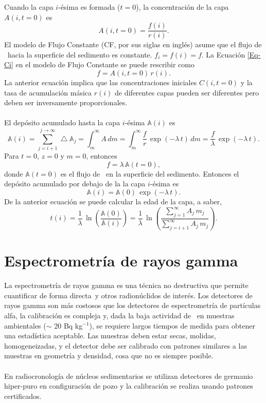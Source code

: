 Cuando la capa $i$-ésima es formada ($t=0$), la concentración de la capa $A(i, t=0)$ es
\begin{equation}\label{Eq-Ci}
A(i, t=0) = \dfrac{f(i)}{r(i)}.
\end{equation}
El modelo de Flujo Constante (CF, por sus siglas en inglés) asume que el flujo de \PbCeroEx\, hacia la superficie del sedimento es constante. $f_i = f(i) = f$. La Ecuación \ref{Eq-Ci} en el modelo de Flujo Constante se puede rescribir como 
\begin{equation}\label{Eq-FC}
f = A(i,t=0)\, r(i).
\end{equation}
La anterior ecuación implica que las concentraciones iniciales $C(i, t=0)$ y la tasa de acumulación másica $r(i)$ de diferentes capas pueden ser diferentes pero deben ser inversamente proporcionales. 
\\ \\ 
El depósito acumulado hasta la capa $i$-ésima $\mathbb{A}(i)$ es 
\begin{equation}
\mathbb{A}(i) = \sum_{j=i+1}^{j\rightarrow \infty} \bigtriangleup \mathbb{A}_j = \int_m^\infty A\, dm =  
\int_m^\infty \dfrac{f}{r}\,\exp(-\lambda\,t)\, dm =  \dfrac{f}{\lambda}\,\exp(-\lambda\,t).
\end{equation}
Para $t=0$, $z=0$ y $m=0$, entonces 
\begin{equation}
f = \lambda\,\mathbb{A}(t=0),
\end{equation}
donde $\mathbb{A}(t=0)$ es el flujo de \PbCeroEx\, en la superficie del sedimento. Entonces el depósito acumulado por debajo de la la capa $i$-ésima es 
\begin{equation}
\mathbb{A}(i) = \mathbb{A}(0)\,\exp(-\lambda\,t).
\end{equation}
De la anterior ecuación se puede calcular la edad de la capa, a saber, 
\begin{equation}\label{Eq-Fechado}
t(i) = \dfrac{1}{\lambda}\,\ln\left(\dfrac{\mathbb{A}(0)}{\mathbb{A}(i)}\right) = \dfrac{1}{\lambda}\,\ln\left(\dfrac{\sum_{j=1}^\infty A_j\, m_j}{ \sum_{j=i+1}^\infty A_j\, m_j}\right).
\end{equation}
\section{Espectrometría de rayos gamma}\label{Secc-IntroEspectrometriaGamma}
La espectrometría de rayos gamma es una técnica no destructiva que permite cuantificar de forma directa \PbCero\,y otros radionúclidos de interés. Los detectores de rayos gamma son más costosos que los detectores de espectrometría de partículas alfa, la calibración es compleja y, dada la baja actividad de \PbCero\, en muestras ambientales ($\sim$ 20 Bq kg$^{-1}$), se requiere largos tiempos de medida para obtener una estadística aceptable. Las muestras deben estar secas, molidas, homogeneizadas, y el detector debe ser calibrado con patrones similares a las muestras en geometría y densidad, cosa que no es siempre posible.
\\ \\ 
En radiocronología de núcleos sedimentarios se utilizan detectores de germanio hiper-puro en configuración de pozo y la calibración se realiza usando patrones certificados.
